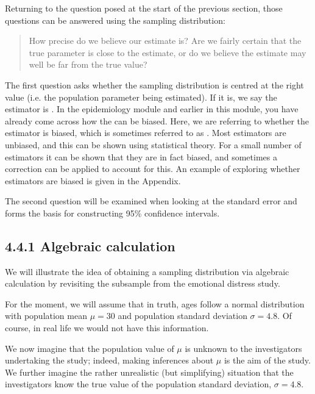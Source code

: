 \documentclass[letterpaper,10pt,english]{jupyterBook}
\begin{document}
\sphinxAtStartPar
Returning to the question posed at the start of the previous section, those questions can be answered using the sampling distribution:
\begin{quote}

\sphinxAtStartPar
 How precise do we believe our estimate is?
 Are we fairly certain that the true parameter is close to the estimate, or do we believe the estimate may well be far from the true value?
\end{quote}

\sphinxAtStartPar
The first question asks whether the sampling distribution is centred at the right value (i.e. the population parameter being estimated). If it is, we say the estimator is . In the epidemiology module and earlier in this module, you have already come across how the  can be biased. Here, we are referring to whether the estimator is biased, which is sometimes referred to as . Most estimators are unbiased, and this can be shown using statistical theory. For a small number of estimators it can be shown that they are in fact biased, and sometimes a correction can be applied to account for this. An example of exploring whether estimators are biased is given in the Appendix.

\sphinxAtStartPar
The second question will be examined when looking at the standard error and forms the basis for constructing 95\% confidence intervals.


\subsection{4.4.1 Algebraic calculation}
\label{\detokenize{04.e. Population.and.samples:algebraic-calculation}}
\sphinxAtStartPar
We will illustrate the idea of obtaining a sampling distribution via algebraic calculation by revisiting the sub\sphinxhyphen{}sample from the emotional distress study.

\sphinxAtStartPar
For the moment, we will assume that in truth, ages follow a normal distribution with population mean \(\mu=30\) and population standard deviation \(\sigma=4.8\). Of course, in real life we would not have this information.

\sphinxAtStartPar
We now imagine that the population value of \(\mu\) is unknown to the investigators undertaking the study; indeed, making inferences about \(\mu\) is the aim of the study. We further imagine the rather unrealistic (but simplifying) situation that the investigators know the true value of the population standard deviation, \(\sigma=4.8\).
\end{document}
